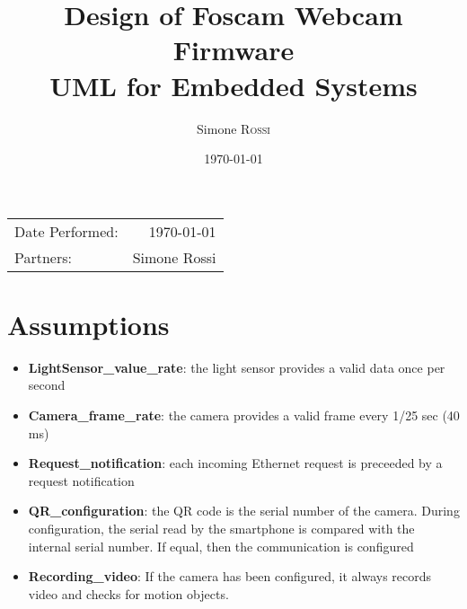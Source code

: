 \documentclass{article}
\title{Design of Foscam Webcam Firmware\\ UML for Embedded Systems} %
\author{Simone \textsc{Rossi}} %
\date{\today} %
\begin{document}
\maketitle %

\begin{center}
\begin{tabular}{l r}
Date Performed: & \today \\ %
Partners: & Simone Rossi \\ %
\end{tabular}
\end{center}



\section{Assumptions}
\begin{itemize}
\item \textbf{LightSensor\_value\_rate}: the light sensor provides a valid data once
per second
\item \textbf{Camera\_frame\_rate}: the camera provides a valid frame every 1/25 sec (40 ms)
\item \textbf{Request\_notification}: each incoming Ethernet request is preceeded by a request
notification
\item \textbf{QR\_configuration}:  the QR code is the serial number of the camera.
During configuration, the serial read by the smartphone is compared with the internal serial number.
If equal, then the communication is configured
\item \textbf{Recording\_video}: If the camera has been configured, it always records video and checks
for motion objects.
\end{itemize}
\end{document}
